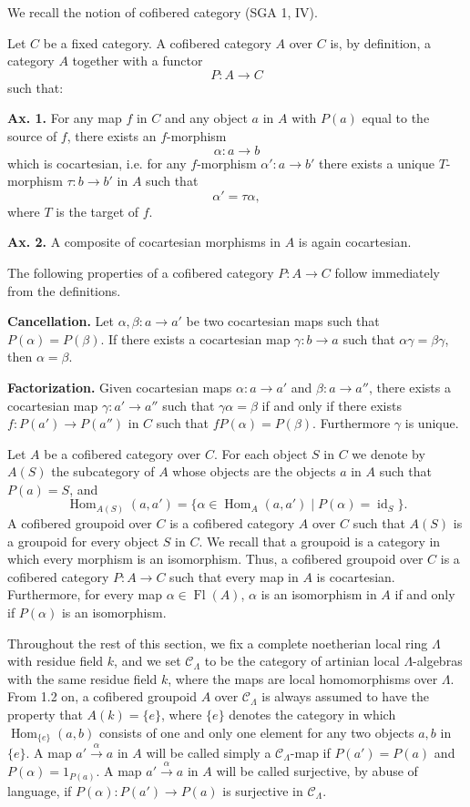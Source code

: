 \documentclass[11pt]{article}
\providecommand{\Hom}{\operatorname{Hom}}
\providecommand{\CL}{\mathcal C_\Lambda}
\providecommand{\id}{\operatorname{id}}
\begin{document}
We recall the notion of cofibered category (SGA 1, IV).

Let $C$ be a fixed category. A cofibered category $A$ over $C$ is, by definition, a category $A$ together with a functor
\[
 P:A\longrightarrow C
\]
such that:

\textbf{Ax. 1.} For any map $f$ in $C$ and any object $a$ in $A$ with $P(a)$ equal to the source of $f$, there exists an $f$-morphism
\[
 \alpha:a\longrightarrow b
\]
which is cocartesian, i.e. for any $f$-morphism $\alpha':a\to b'$ there exists a unique $T$-morphism $\tau:b\to b'$ in $A$ such that
\[
 \alpha'=\tau\alpha,
\]
where $T$ is the target of $f$.

\textbf{Ax. 2.} A composite of cocartesian morphisms in $A$ is again cocartesian.

The following properties of a cofibered category $P:A\to C$ follow immediately from the definitions.

\textbf{Cancellation.} Let $\alpha,\beta:a\to a'$ be two cocartesian maps such that $P(\alpha)=P(\beta)$. If there exists a cocartesian map $\gamma:b\to a$ such that $\alpha\gamma=\beta\gamma$, then $\alpha=\beta$.

\textbf{Factorization.} Given cocartesian maps $\alpha:a\to a'$ and $\beta:a\to a''$, there exists a cocartesian map $\gamma:a'\to a''$ such that $\gamma\alpha=\beta$ if and only if there exists $f:P(a')\to P(a'')$ in $C$ such that $fP(\alpha)=P(\beta)$. Furthermore $\gamma$ is unique.

Let $A$ be a cofibered category over $C$. For each object $S$ in $C$ we denote by $A(S)$ the subcategory of $A$ whose objects are the objects $a$ in $A$ such that $P(a)=S$, and
\[
 \Hom_{A(S)}(a,a')=\{\alpha\in\Hom_A(a,a')\mid P(\alpha)=\id_S\}.
\]
A cofibered groupoid over $C$ is a cofibered category $A$ over $C$ such that $A(S)$ is a groupoid for every object $S$ in $C$. We recall that a groupoid is a category in which every morphism is an isomorphism. Thus, a cofibered groupoid over $C$ is a cofibered category $P:A\to C$ such that every map in $A$ is cocartesian. Furthermore, for every map $\alpha\in\operatorname{Fl}(A)$, $\alpha$ is an isomorphism in $A$ if and only if $P(\alpha)$ is an isomorphism.

Throughout the rest of this section, we fix a complete noetherian local ring $\Lambda$ with residue field $k$, and we set $\CL$ to be the category of artinian local $\Lambda$-algebras with the same residue field $k$, where the maps are local homomorphisms over $\Lambda$. From 1.2 on, a cofibered groupoid $A$ over $\CL$ is always assumed to have the property that $A(k)=\{e\}$, where $\{e\}$ denotes the category in which $\Hom_{\{e\}}(a,b)$ consists of one and only one element for any two objects $a,b$ in $\{e\}$. A map $a'\xrightarrow{\alpha}a$ in $A$ will be called simply a $\CL$-map if $P(a')=P(a)$ and $P(\alpha)=1_{P(a)}$. A map $a'\xrightarrow{\alpha}a$ in $A$ will be called surjective, by abuse of language, if $P(\alpha):P(a')\to P(a)$ is surjective in $\CL$.
\end{document}
